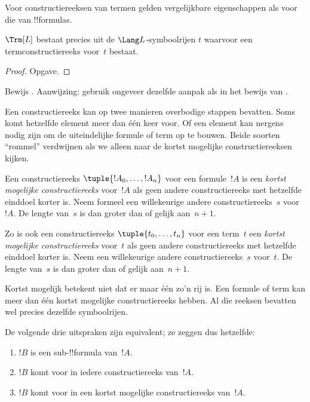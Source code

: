 \documentclass[../../../include/open-logic-section]{subfiles}
\begin{document}
Voor constructiereeksen van termen gelden vergelijkbare eigenschappen
als voor die van !!{formula}s.

\begin{prop}
$\Trm[L]$ bestaat precies uit de $\Lang L$-symboolrijen $t$
waarvoor een termconstructiereeks voor~$t$ bestaat.
\end{prop}

\begin{proof}
Opgave.
\end{proof}

\begin{prob}
Bewijs .
Aanwijzing: gebruik ongeveer dezelfde aanpak als in het bewijs van
.
\end{prob}

Een constructiereeks kan op twee manieren overbodige stappen bevatten.
Soms komt hetzelfde element meer dan één keer voor. Of een element kan nergens nodig zijn
om de uiteindelijke formule of term op te bouwen. Beide soorten
``rommel'' verdwijnen als we alleen naar de kortst mogelijke
constructiereeksen kijken.

\begin{defn}
Een constructiereeks $\tuple{!A_0, \ldots, !A_n}$ voor een
formule~$!A$ is een \emph{kortst mogelijke constructiereeks} voor~$!A$
als geen andere constructiereeks met hetzelfde einddoel korter is.
Neem formeel een willekeurige andere constructiereeks~$s$ voor~$!A$.
De lengte van~$s$ is dan groter dan of gelijk aan~$n+1$.

Zo is ook een constructiereeks $\tuple{t_0, \ldots, t_n}$
voor een term~$t$ een \emph{kortst mogelijke constructiereeks}
voor~$t$ als geen andere constructiereeks met hetzelfde einddoel korter
is. Neem een willekeurige andere constructiereeks~$s$ voor~$t$. De
lengte van~$s$ is dan groter dan of gelijk aan~$n+1$.
\end{defn}

Kortst mogelijk betekent niet dat er maar één zo'n rij is. Een formule
of term kan meer dan één kortst mogelijke constructiereeks hebben. Al
die reeksen bevatten wel precies dezelfde symboolrijen.

\begin{prop}
De volgende drie uitspraken zijn equivalent; ze zeggen dus hetzelfde:
\begin{enumerate}
    \item $!B$ is een sub-!!{formula} van~$!A$.
    \item $!B$ komt voor in iedere constructiereeks van~$!A$.
    \item $!B$ komt voor in een kortst mogelijke constructiereeks van~$!A$.
\end{enumerate}
\end{prop}
\end{document}
